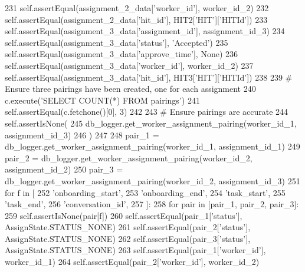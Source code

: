 \begin{DoxyCode}
231         self.assertEqual(assignment\_2\_data[\textcolor{stringliteral}{'worker\_id'}], worker\_id\_2)
232         self.assertEqual(assignment\_2\_data[\textcolor{stringliteral}{'hit\_id'}], HIT2[\textcolor{stringliteral}{'HIT'}][\textcolor{stringliteral}{'HITId'}])
233         self.assertEqual(assignment\_3\_data[\textcolor{stringliteral}{'assignment\_id'}], assignment\_id\_3)
234         self.assertEqual(assignment\_3\_data[\textcolor{stringliteral}{'status'}], \textcolor{stringliteral}{'Accepted'})
235         self.assertEqual(assignment\_3\_data[\textcolor{stringliteral}{'approve\_time'}], \textcolor{keywordtype}{None})
236         self.assertEqual(assignment\_3\_data[\textcolor{stringliteral}{'worker\_id'}], worker\_id\_2)
237         self.assertEqual(assignment\_3\_data[\textcolor{stringliteral}{'hit\_id'}], HIT3[\textcolor{stringliteral}{'HIT'}][\textcolor{stringliteral}{'HITId'}])
238 
239         \textcolor{comment}{# Ensure three pairings have been created, one for each assignment}
240         c.execute(\textcolor{stringliteral}{'SELECT COUNT(*) FROM pairings'})
241         self.assertEqual(c.fetchone()[0], 3)
242 
243         \textcolor{comment}{# Ensure pairings are accurate}
244         self.assertIsNone(
245             db\_logger.get\_worker\_assignment\_pairing(worker\_id\_1, assignment\_id\_3)
246         )
247 
248         pair\_1 = db\_logger.get\_worker\_assignment\_pairing(worker\_id\_1, assignment\_id\_1)
249         pair\_2 = db\_logger.get\_worker\_assignment\_pairing(worker\_id\_2, assignment\_id\_2)
250         pair\_3 = db\_logger.get\_worker\_assignment\_pairing(worker\_id\_2, assignment\_id\_3)
251         \textcolor{keywordflow}{for} f \textcolor{keywordflow}{in} [
252             \textcolor{stringliteral}{'onboarding\_start'},
253             \textcolor{stringliteral}{'onboarding\_end'},
254             \textcolor{stringliteral}{'task\_start'},
255             \textcolor{stringliteral}{'task\_end'},
256             \textcolor{stringliteral}{'conversation\_id'},
257         ]:
258             \textcolor{keywordflow}{for} pair \textcolor{keywordflow}{in} [pair\_1, pair\_2, pair\_3]:
259                 self.assertIsNone(pair[f])
260         self.assertEqual(pair\_1[\textcolor{stringliteral}{'status'}], AssignState.STATUS\_NONE)
261         self.assertEqual(pair\_2[\textcolor{stringliteral}{'status'}], AssignState.STATUS\_NONE)
262         self.assertEqual(pair\_3[\textcolor{stringliteral}{'status'}], AssignState.STATUS\_NONE)
263         self.assertEqual(pair\_1[\textcolor{stringliteral}{'worker\_id'}], worker\_id\_1)
264         self.assertEqual(pair\_2[\textcolor{stringliteral}{'worker\_id'}], worker\_id\_2)

\end{DoxyCode}
